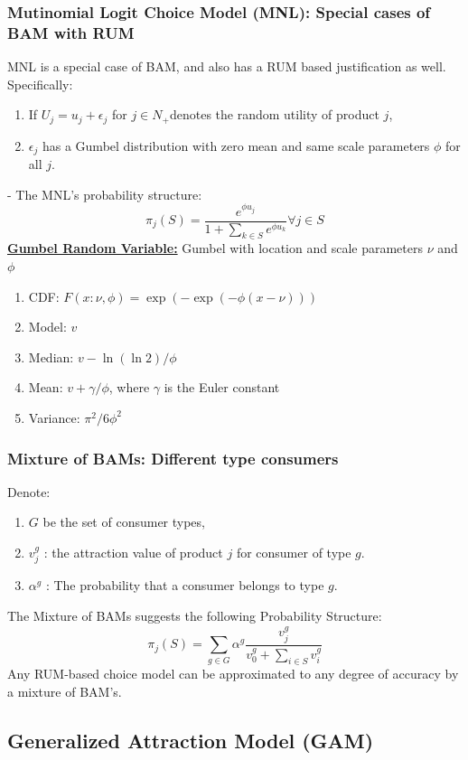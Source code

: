 \documentclass[11pt,a4paper]{article}
\begin{document}
\subsubsection{Mutinomial Logit Choice Model (MNL): Special cases of BAM with RUM}
MNL is a special case of BAM, and also has a RUM based justification as well. Specifically:
\begin{enumerate}[$\bullet$]
    \item If $U_{j}=u_{j}+\epsilon_{j}$ for $j \in N_{+}$denotes the random utility of product $j$,
    \item $\epsilon_{j}$ has a Gumbel distribution with zero mean and same scale parameters $\phi$ for all $j$.
\end{enumerate}
- The MNL's probability structure:
$$
\pi_{j}(S)=\frac{e^{\phi u_{j}}}{1+\sum_{k \in S} e^{\phi u_{k}}} \forall j \in S
$$
\underline{\textbf{Gumbel Random Variable:}} Gumbel with location and scale parameters $\nu$ and $\phi$
\begin{enumerate}[$\bullet$]
    \item CDF:
    $
    F(x: \nu, \phi)=\exp (-\exp (-\phi(x-\nu)))
    $
    \item Model: $v$
    \item Median: $v-\ln (\ln 2) / \phi$
    \item Mean: $v+\gamma / \phi$, where $\gamma$ is the Euler constant
    \item Variance: $\pi^{2} / 6 \phi^{2}$
\end{enumerate}

\subsubsection{Mixture of BAMs: Different type consumers}
Denote:
\begin{enumerate}[$\bullet$]
    \item $G$ be the set of consumer types,
    \item $v_{j}^{g}$ : the attraction value of product $j$ for consumer of type $g$.
    \item $\alpha^{g}$ : The probability that a consumer belongs to type $g$.
\end{enumerate}
The Mixture of BAMs suggests the following Probability Structure:
$$
\pi_{j}(S)=\sum_{g \in G} \alpha^{g} \frac{v_{j}^{g}}{v_{0}^{g}+\sum_{i \in S} v_{i}^{g}}
$$
Any RUM-based choice model can be approximated to any degree of accuracy by a mixture of BAM's.

\subsection{Generalized Attraction Model (GAM)}
\end{document}
